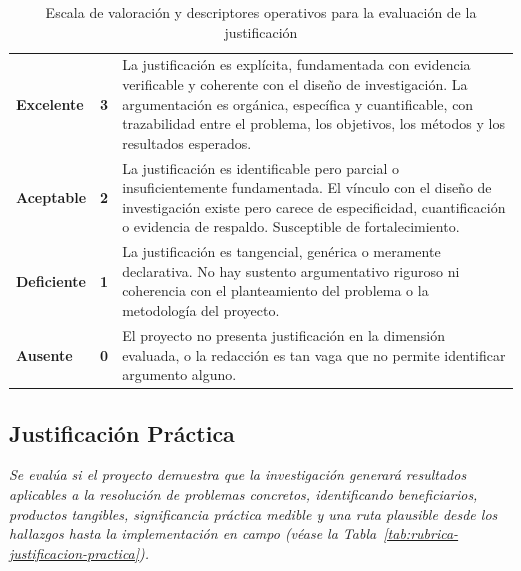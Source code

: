 \begin{table}[htbp]
\centering
\scriptsize
\caption{Escala de valoración y descriptores operativos para la evaluación de la justificación}
\label{tab:escala-valoracion-justificacion}
\begin{tabularx}{\textwidth}{|C{2.8cm}|C{1cm}|X|}
\hline
{}
 &  &  \\ \hline
\textcolor{csuf}{\textbf{Excelente}} & \textbf{3} & La justificación es explícita, fundamentada con evidencia verificable y coherente con el diseño de investigación.
La argumentación es orgánica, específica y cuantificable, con trazabilidad entre el problema, los objetivos, los métodos y los resultados esperados.
\\ \hline
{}
\textcolor{cace}{\textbf{Aceptable}} & \textbf{2} & La justificación es identificable pero parcial o insuficientemente fundamentada.
El vínculo con el diseño de investigación existe pero carece de especificidad, cuantificación o evidencia de respaldo. Susceptible de fortalecimiento.
\\ \hline
\textcolor{cdef}{\textbf{Deficiente}} & \textbf{1} & La justificación es tangencial, genérica o meramente declarativa.
No hay sustento argumentativo riguroso ni coherencia con el planteamiento del problema o la metodología del proyecto.
\\ \hline
{}
\textcolor{cins}{\textbf{Ausente}} & \textbf{0} & El proyecto no presenta justificación en la dimensión evaluada, o la redacción es tan vaga que no permite identificar argumento alguno.
\\ \hline
\end{tabularx}
\end{table}

\clearpage
\subsection{Justificación Práctica}

\textit{Se evalúa si el proyecto demuestra que la investigación generará resultados aplicables a la resolución de problemas concretos, identificando beneficiarios, productos tangibles, significancia práctica medible y una ruta plausible desde los hallazgos hasta la implementación en campo (véase la Tabla~\ref{tab:rubrica-justificacion-practica}).}

